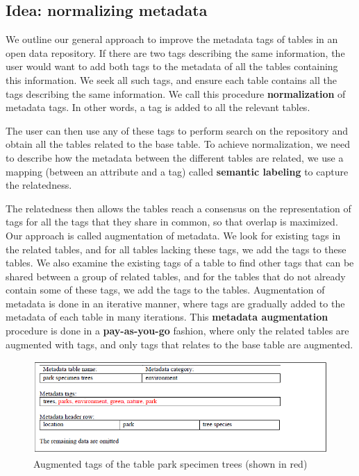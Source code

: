 \subsection{Idea: normalizing metadata}

We outline our general approach to improve the metadata tags of tables in an open data repository. If there are two tags describing the same information, the user would want to add both tags to the metadata of all the tables containing this information. We seek all such tags, and ensure each table contains all the tags describing the same information. We call this procedure \textbf{\gls{normalization}} of metadata tags. In other words, a tag is added to all the relevant tables.

The user can then use any of these tags to perform search on the repository and obtain all the tables related to the base table. To achieve normalization, we need to describe how the metadata between the different tables are related, we use a mapping (between an attribute and a tag) called \textbf{\gls{semantic labeling}} to capture the relatedness.

The relatedness then allows the tables reach a consensus on the representation of tags for all the tags that they share in common, so that overlap is maximized. Our approach is called augmentation of metadata. We look for existing tags in the related tables, and for all tables lacking these tags, we add the tags to these tables. We also examine the existing tags of a table to find other tags that can be shared between a group of related tables, and for the tables that do not already contain some of these tags, we add the tags to the tables. Augmentation of metadata is done in an iterative manner, where tags are gradually added to the metadata of each table in many iterations. This \textbf{\gls{metadata augmentation}} procedure is done in a \textbf{\gls{pay-as-you-go}} fashion, where only the related tables are augmented with tags, and only tags that relates to the base table are augmented.

\begin{figure}
    \centering
    \includegraphics[width=5in]{figures/augmented-park-specimen-trees.png}
    \caption{Augmented tags of the table park specimen trees (shown in red)}
    \label{fig:augmented-park-specimen-trees}
\end{figure}

